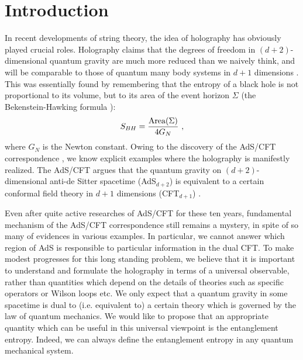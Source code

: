 \documentclass[12pt]{article}
\def\frac#1#2{{#1\over #2}}
\def\f {\frac}
\def\frac#1#2{{#1\over #2}}
\def\be{\begin{equation}}
\def\ee{\end{equation}}
\begin{document}
\section{Introduction}
\label{intro} \setcounter{equation}{0}
\hspace{5mm}
In recent developments of string theory, the idea of holography has obviously
played crucial roles. Holography claims that the degrees of freedom in $(d+2)$-dimensional
quantum gravity are much more reduced than we naively think, and
will be comparable to those of quantum many body systems in $d+1$
dimensions \cite{holography,BiSu}. This was essentially found by remembering that
the entropy of a black hole
is not proportional to its volume, but to its area of the
event horizon $\Sigma$ (the Bekenstein-Hawking formula \cite{BeHa}):
\be
S_{BH}=\f{\mbox{Area}(\Sigma)}{4G_N}\ ,\label{BHF}
\ee
where $G_N$ is the Newton constant.
Owing to the discovery of the AdS/CFT correspondence
\cite{Maldacena}, we know explicit examples where the holography
is manifestly realized. The AdS/CFT argues that the quantum gravity on $(d+2)$-dimensional
anti-de Sitter spacetime (AdS$_{d+2}$) is equivalent to a certain conformal field
theory in $d+1$ dimensions (CFT$_{d+1}$) \cite{Maldacena,ADSGKP,ADSWitten,adsreview}.

Even after quite active researches of AdS/CFT for these ten years, fundamental mechanism of
the AdS/CFT correspondence still remains a mystery, in spite of so many of evidences in various examples.
In particular, we cannot answer which region of AdS is responsible to particular information
in the dual CFT. To make modest progresses
for this long standing problem, we believe that
it is important to understand and formulate the holography in terms of
a universal observable,
rather than quantities which depend on the details of theories such as specific operators or
Wilson loops etc. We only expect that a quantum gravity in some spacetime is dual to
(i.e. equivalent to) a certain theory which is governed by the law of quantum mechanics.
We would like to propose
that an appropriate quantity which can be useful in this universal
viewpoint is the entanglement entropy. Indeed, we can always define the entanglement entropy in
any quantum mechanical system.
\end{document}
